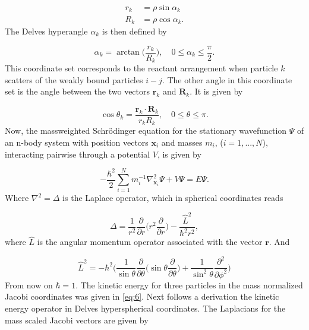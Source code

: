\documentclass{article}
\numberwithin{equation}{section}
\begin{document}
\begin{subequations}
	\begin{align}
		r_{k} &= \rho \sin{\alpha_{k}}\\
		R_{k} &= \rho \cos{\alpha_{k}}.
	\end{align}
\end{subequations}
The Delves hyperangle $\alpha_{k}$ is then defined by

\begin{equation}
	\alpha_{k} = \arctan\bigg(\frac{r_{k}}{R_{k}}\bigg), \quad 0\leq \alpha_{k} \leq \frac{\pi}{2}.
\end{equation}
This coordinate set corresponds to the reactant arrangement when particle $k$ scatters of the weakly bound particles $i-j$. The other angle in this coordinate set is the angle between the two vectors $\mathbf{r}_{k}$ and $\mathbf{R}_{k}$. It is given by

\begin{equation}
\cos{\theta_{k}} = \frac{\mathbf{r}_{k} \cdot \mathbf{R}_{k}}{r_{k} R_{k}}, \quad  0\leq \theta \leq \pi.
\end{equation}
Now, the massweighted Schr{\"o}dinger equation for the stationary wavefunction $\Psi$ of an n-body system with position vectors $\mathbf{x}_i$ and masses $m_i$, ($i=1,...,N$), interacting pairwise through a potential $V$, is given by

\begin{equation}
-\frac{\hbar^2}{2} \sum_{i=1}^{N} m^{-1}_{i} \nabla^{2}_{\mathbf{x}_{i}} \Psi + V\Psi = E \Psi. 
\end{equation}
Where $\nabla^{2}=\Delta$ is the Laplace operator, which in spherical coordinates reads

\begin{equation}
\Delta = \frac{1}{r^{2}}\frac{\partial}{\partial r} \bigg(r^{2} \frac{\partial}{\partial r}\bigg) - \frac{\hat{L}^{2}}{\hbar^2 r^{2}},
\end{equation}
where $\hat{L}$ is the angular momentum operator associated with the vector $\mathbf{r}$. And

\begin{equation}
\hat{L}^{2} = -\hbar^{2}\Bigg(\frac{1}{\sin{\theta}}\frac{\partial}{\partial \theta} \bigg(\sin{\theta}\frac{\partial}{\partial \theta}\bigg) + \frac{1}{\sin^{2}{\theta}} \frac{\partial^{2}}{\partial \phi^{2}}\Bigg)
\end{equation}
From now on $\hbar = 1$. The kinetic energy for three particles in the mass normalized Jacobi coordinates was given in \eqref{eq:6}. Next follows a derivation the kinetic energy operator in Delves hyperspherical coordinates. The Laplacians for the mass scaled Jacobi vectors are given by
\end{document}
